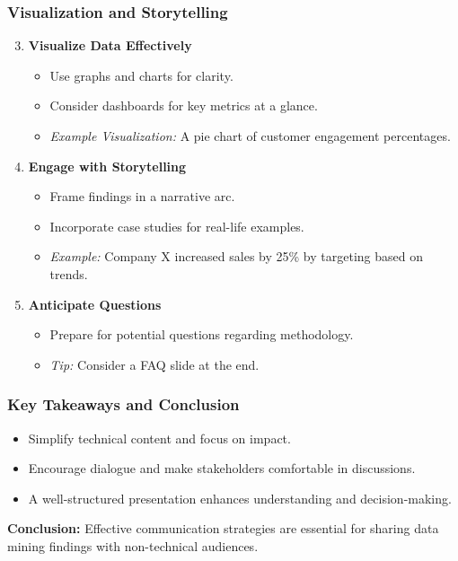 \documentclass[aspectratio=169]{beamer}
\begin{document}
\begin{frame}[fragile]
    \frametitle{Visualization and Storytelling}
    \begin{enumerate}
        \setcounter{enumi}{2}
        \item \textbf{Visualize Data Effectively}
            \begin{itemize}
                \item Use graphs and charts for clarity.
                \item Consider dashboards for key metrics at a glance.
                \item \textit{Example Visualization:} A pie chart of customer engagement percentages.
            \end{itemize}

        \item \textbf{Engage with Storytelling}
            \begin{itemize}
                \item Frame findings in a narrative arc.
                \item Incorporate case studies for real-life examples.
                \item \textit{Example:} Company X increased sales by 25\% by targeting based on trends.
            \end{itemize}

        \item \textbf{Anticipate Questions}
            \begin{itemize}
                \item Prepare for potential questions regarding methodology.
                \item \textit{Tip:} Consider a FAQ slide at the end.
            \end{itemize}
    \end{enumerate}
\end{frame}

\begin{frame}[fragile]
    \frametitle{Key Takeaways and Conclusion}
    \begin{itemize}
        \item Simplify technical content and focus on impact.
        \item Encourage dialogue and make stakeholders comfortable in discussions.
        \item A well-structured presentation enhances understanding and decision-making.
    \end{itemize}

    \textbf{Conclusion:} Effective communication strategies are essential for sharing data mining findings with non-technical audiences.
\end{frame}
\end{document}
